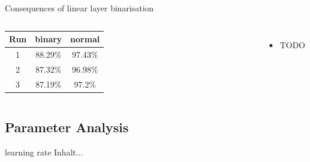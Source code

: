 \documentclass[aspectratio=1610, 12pt]{beamer}
\begin{document}
\begin{frame}{Consequences of linear layer binarisation}


\begin{columns}
	\centering
		\begin{tabular}{|c|c|c|}\hline
		Run&binary&normal\\\hline
		1&88.29\%&97.43\%\\\hline
		2&87.32\%&96.98\%\\\hline
		3&87.19\%&97.2\%\\\hline
	\end{tabular}	
	\begin{itemize}
		\item TODO
	\end{itemize}
	
\end{columns}


\end{frame}

\subsection{Parameter Analysis}
\begin{frame}{learning rate}
Inhalt...
\end{frame}
\end{document}
